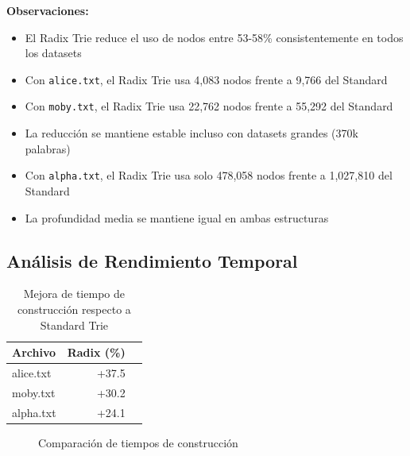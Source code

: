 \documentclass[11pt,a4paper]{article}
\begin{document}
\textbf{Observaciones:}
\begin{itemize}
    \item El Radix Trie reduce el uso de nodos entre 53-58\% consistentemente en todos los datasets
    \item Con \texttt{alice.txt}, el Radix Trie usa 4,083 nodos frente a 9,766 del Standard
    \item Con \texttt{moby.txt}, el Radix Trie usa 22,762 nodos frente a 55,292 del Standard
    \item La reducción se mantiene estable incluso con datasets grandes (370k palabras)
    \item Con \texttt{alpha.txt}, el Radix Trie usa solo 478,058 nodos frente a 1,027,810 del Standard
    \item La profundidad media se mantiene igual en ambas estructuras
\end{itemize}

\subsection{Análisis de Rendimiento Temporal}

\begin{table}[H]
\centering
\caption{Mejora de tiempo de construcción respecto a Standard Trie}
\label{tab:tiempos_mejora}
\begin{tabular}{|l|r|r|}
\hline
\textbf{Archivo} & \textbf{Radix (\%)} \\
\hline
alice.txt & +37.5 \\
moby.txt & +30.2 \\
alpha.txt & +24.1 \\
\hline
\end{tabular}
\end{table}

\begin{figure}[H]
\centering
{}
\caption{Comparación de tiempos de construcción}
\label{fig:tiempos}
\end{figure}
\end{document}
